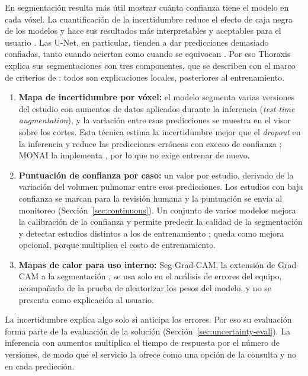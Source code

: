 En segmentación resulta más útil mostrar cuánta confianza tiene el modelo en
cada vóxel. La cuantificación de la incertidumbre reduce el efecto de caja
negra de los modelos y hace sus resultados más interpretables y aceptables para
el usuario \parencite{lambert2024}. Las U-Net, en particular, tienden a dar
predicciones demasiado confiadas, tanto cuando aciertan como cuando se
equivocan \parencite{mehrtash2020}. Por eso Thoraxis explica sus segmentaciones
con tres componentes, que se describen con el marco de criterios de
\textcite{vandervelden2022}: todos son explicaciones locales, posteriores al
entrenamiento.

\begin{enumerate}
    \item \textbf{Mapa de incertidumbre por vóxel:} el modelo segmenta varias
          versiones del estudio con aumentos de datos aplicados durante la
          inferencia (\textit{test-time augmentation}), y la variación entre
          esas predicciones se muestra en el visor sobre los cortes. Esta
          técnica estima la incertidumbre mejor que el \textit{dropout} en la
          inferencia y reduce las predicciones erróneas con exceso de
          confianza \parencite{wang2019}; MONAI la implementa
          \parencite{cardoso2022}, por lo que no exige entrenar de nuevo.
    \item \textbf{Puntuación de confianza por caso:} un valor por estudio,
          derivado de la variación del volumen pulmonar entre esas
          predicciones. Los estudios con baja confianza se marcan para la
          revisión humana y la puntuación se envía al monitoreo
          (Sección~\ref{sec:continuous}). Un conjunto de varios modelos
          mejora la calibración de la confianza y permite predecir la calidad
          de la segmentación y detectar estudios distintos a los de
          entrenamiento \parencite{mehrtash2020}; queda como mejora opcional,
          porque multiplica el costo de entrenamiento.
    \item \textbf{Mapas de calor para uso interno:} Seg-Grad-CAM, la extensión
          de Grad-CAM a la segmentación \parencite{vinogradova2020}, se usa
          solo en el análisis de errores del equipo, acompañado de la prueba
          de aleatorizar los pesos del modelo, y no se presenta como
          explicación al usuario.
\end{enumerate}

La incertidumbre explica algo solo si anticipa los errores. Por eso su
evaluación forma parte de la evaluación de la solución
(Sección~\ref{sec:uncertainty-eval}). La inferencia con aumentos multiplica el
tiempo de respuesta por el número de versiones, de modo que el servicio la
ofrece como una opción de la consulta y no en cada predicción.

